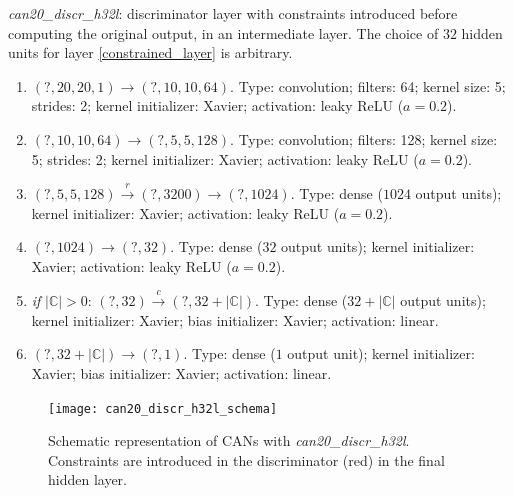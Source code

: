 \begin{description}
\item \textit{can20\_discr\_h32l}: discriminator layer with constraints introduced before computing the original output, in an intermediate layer. The choice of $32$ hidden units for layer \ref{constrained_layer} is arbitrary.
\begin{enumerate}
    \item $(?, 20, 20, 1) \to (?, 10, 10, 64)$. Type: convolution; filters: 64; kernel size: 5; strides: 2; kernel initializer: Xavier; activation: leaky ReLU ($a = 0.2$).
    \item $(?, 10, 10, 64) \to (?, 5, 5, 128)$. Type: convolution; filters: 128; kernel size: 5; strides: 2; kernel initializer: Xavier; activation: leaky ReLU ($a = 0.2$).
    \item $(?, 5, 5, 128) \stackrel{r}{\to} (?, 3200) \to (?, 1024)$. Type: dense ($1024$ output units); kernel initializer: Xavier; activation: leaky ReLU ($a = 0.2$).
    \item $(?, 1024) \to (?, 32)$. Type: dense ($32$ output units); kernel initializer: Xavier; activation: leaky ReLU ($a = 0.2$).
    \item \label{constrained_layer} \textit{if} $|\mathbb{C}| > 0$: $(?, 32) \stackrel{c}{\to} (?, 32+|\mathbb{C}|)$. Type: dense ($32+|\mathbb{C}|$ output units); kernel initializer: Xavier; bias initializer: Xavier; activation: linear.
    \item $(?, 32+|\mathbb{C}|) \to (?, 1)$. Type: dense ($1$ output unit); kernel initializer: Xavier; bias initializer: Xavier; activation: linear.
\end{enumerate}

\begin{figure}[ht]
    \centering
    \texttt{[image: can20\_discr\_h32l\_schema]}
    \caption{Schematic representation of CANs with \textit{can20\_discr\_h32l}. Constraints are introduced in the discriminator (red) in the final hidden layer.}
\end{figure}


\end{description}
